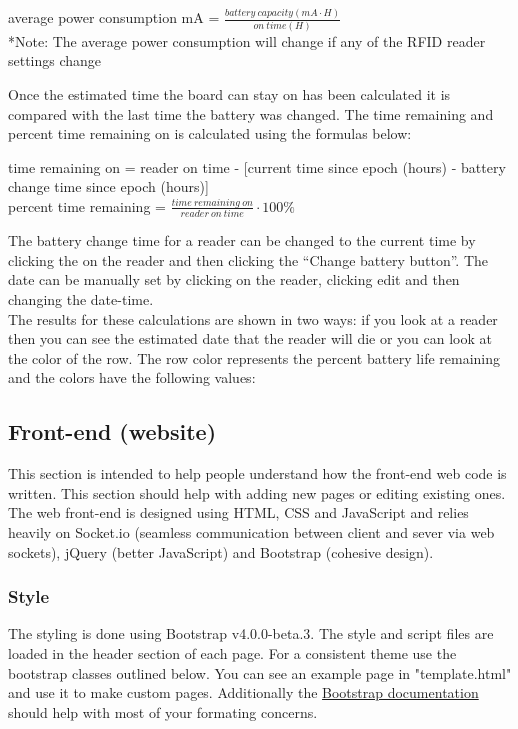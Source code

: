 \documentclass[12pt]{article}
\begin{document}
\begin{center}
	 average power consumption mA = $ \frac{battery\:capacity(mA \cdot H)}{on\:time(H)}$\\
	 *Note: The average power consumption will change if any of the RFID reader settings change
\end{center}
Once the estimated time the board can stay on has been calculated it is compared with the last time the battery was changed.  The time remaining and percent time remaining on is calculated using the formulas below:
\begin{center}
	time remaining on = reader on time - [current time since epoch (hours) - battery change time since epoch (hours)]\\
	percent time remaining = $\frac{time\:remaining\:on}{reader\:on\:time} \cdot 100\%$
\end{center}
The battery change time for a reader can be changed to the current time by clicking the on the reader and then clicking the ``Change battery button''.  The date can be manually set by clicking on the reader, clicking edit and then changing the date-time.\\

The results for these calculations are shown in two ways: if you look at a reader then you can see the estimated date that the reader will die or you can look at the color of the row.  The row color represents the percent battery life remaining and the colors have the following values:

\subsection{Front-end (website)}
This section is intended to help people understand how the front-end web code is written.  This section should help with adding new pages or editing existing ones.\\  
The web front-end is designed using HTML, CSS and JavaScript and relies heavily on Socket.io (seamless communication between client and sever via web sockets), jQuery (better JavaScript) and Bootstrap (cohesive design).

\subsubsection{Style}
The styling is done using Bootstrap v4.0.0-beta.3.  The style and script files are loaded in the header section of each page.  For a consistent theme use the bootstrap classes outlined below.  You can see an example page in "template.html" and use it to make custom pages.  Additionally the \href{https://getbootstrap.com/docs/4.2/getting-started/introduction/}{Bootstrap documentation} should help with most of your formating concerns.\\
\end{document}
